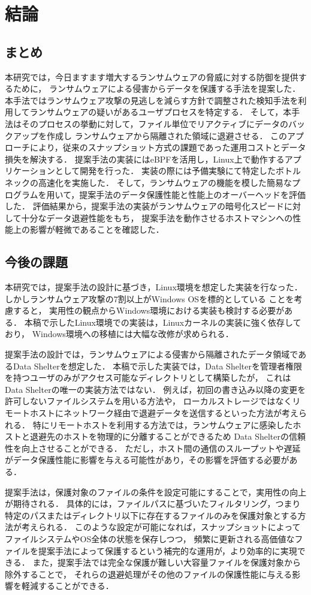 \chapter{結論}
\section{まとめ}
本研究では，今日ますます増大するランサムウェアの脅威に対する防御を提供するために，
ランサムウェアによる侵害からデータを保護する手法を提案した．
本手法ではランサムウェア攻撃の見逃しを減らす方針で調整された検知手法を利用してランサムウェアの疑いがあるユーザプロセスを特定する．
そして，本手法はそのプロセスの挙動に対して，ファイル単位でリアクティブにデータのバックアップを作成し
ランサムウェアから隔離された領域に退避させる．
このアプローチにより，従来のスナップショット方式の課題であった運用コストとデータ損失を解決する．
提案手法の実装にはeBPFを活用し，Linux上で動作するアプリケーションとして開発を行った．
実装の際には予備実験にて特定したボトルネックの高速化を実施した．
そして，ランサムウェアの機能を模した簡易なプログラムを用いて，提案手法のデータ保護性能と性能上のオーバーヘッドを評価した．
評価結果から，提案手法の実装がランサムウェアの暗号化スピードに対して十分なデータ退避性能をもち，
提案手法を動作させるホストマシンへの性能上の影響が軽微であることを確認した．

\section{今後の課題}
本研究では，提案手法の設計に基づき，Linux環境を想定した実装を行なった．
しかしランサムウェア攻撃の7割以上がWindows OSを標的としている \cite{trendmicro-report} ことを考慮すると，
実用性の観点からWindows環境における実装も検討する必要がある．
本稿で示したLinux環境での実装は，Linuxカーネルの実装に強く依存しており，
Windows環境への移植には大幅な改修が求められる．

提案手法の設計では，ランサムウェアによる侵害から隔離されたデータ領域であるData Shelterを想定した．
本稿で示した実装では，Data Shelterを管理者権限を持つユーザのみがアクセス可能なディレクトリとして構築したが，
これはData Shelterの唯一の実装方法ではない．
例えば，初回の書き込み以降の変更を許可しないファイルシステムを用いる方法や，
ローカルストレージではなくリモートホストにネットワーク経由で退避データを送信するといった方法が考えられる．
特にリモートホストを利用する方法では，ランサムウェアに感染したホストと退避先のホストを物理的に分離することができるため
Data Shelterの信頼性を向上させることができる．
ただし，ホスト間の通信のスループットや遅延がデータ保護性能に影響を与える可能性があり，その影響を評価する必要がある．

提案手法は，保護対象のファイルの条件を設定可能にすることで，実用性の向上が期待される．
具体的には，ファイルパスに基づいたフィルタリング，つまり特定のパスまたはディレクトリ以下に存在するファイルのみを保護対象とする方法が考えられる．
このような設定が可能になれば，スナップショットによってファイルシステムやOS全体の状態を保存しつつ，
頻繁に更新される高価値なファイルを提案手法によって保護するという補完的な運用が，より効率的に実現できる．
また，提案手法では完全な保護が難しい大容量ファイルを保護対象から除外することで，
それらの退避処理がその他のファイルの保護性能に与える影響を軽減することができる．
